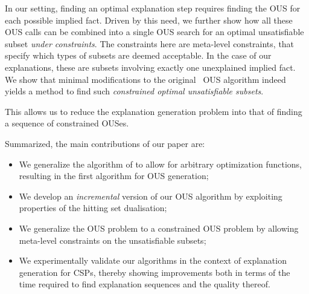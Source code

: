 In our setting, finding an optimal explanation step requires finding the OUS for each possible implied fact. Driven by this need, we further show how all these OUS calls can be combined into a single OUS search for an optimal unsatisfiable subset \emph{under constraints}. The constraints here are meta-level constraints, that specify which types of subsets are deemed acceptable. In the case of our explanations, these are subsets involving exactly one unexplained implied fact.
We show that minimal modifications to the original \hitsetbased~OUS algorithm indeed yields a method to find such \emph{constrained optimal unsatisfiable subsets}.

This allows us to reduce the explanation generation problem into that of finding a sequence of constrained OUSes.




Summarized, the main contributions of our paper are:
\begin{itemize}
  \item We generalize the algorithm of \citet{ignatiev2015smallest} to allow for arbitrary  optimization functions, resulting in the first algorithm for OUS generation;
  \item We develop an \emph{incremental} version of our OUS algorithm by exploiting properties of the hitting set dualisation;
  \item We generalize the OUS problem to a constrained OUS problem by allowing meta-level constraints on the unsatisfiable subsets; %
  \item We experimentally validate our algorithms in the context of explanation generation for CSPs, thereby showing improvements both in terms of the time required to find explanation sequences and the quality thereof. %
\end{itemize}



